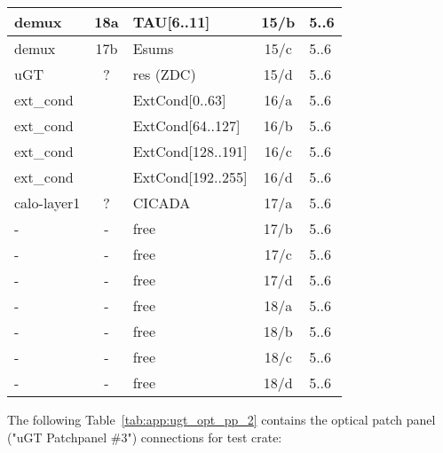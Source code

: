 \begin{longtable}{|l|c|l|c|l|}
demux & 18a & TAU[6..11] & 15/b & 5..6 \\\hline
demux & 17b & Esums      & 15/c & 5..6 \\\hline
uGT   & ?   & res (ZDC)  & 15/d & 5..6 \\\hline
ext\_cond &     & ExtCond[0..63]    & 16/a & 5..6 \\\hline
ext\_cond &     & ExtCond[64..127]  & 16/b & 5..6 \\\hline
ext\_cond &     & ExtCond[128..191] & 16/c & 5..6 \\\hline
ext\_cond &     & ExtCond[192..255] & 16/d & 5..6 \\\hline
calo-layer1 & ? & CICADA & 17/a & 5..6 \\\hline
- & - & free & 17/b & 5..6 \\\hline
- & - & free & 17/c & 5..6 \\\hline
- & - & free & 17/d & 5..6 \\\hline
- & - & free & 18/a & 5..6 \\\hline
- & - & free & 18/b & 5..6 \\\hline
- & - & free & 18/c & 5..6 \\\hline
- & - & free & 18/d & 5..6 \\\hline
\end{longtable}

The following Table~\ref{tab:app:ugt_opt_pp_2} contains the optical patch panel ("uGT Patchpanel \#3") connections for test crate:

